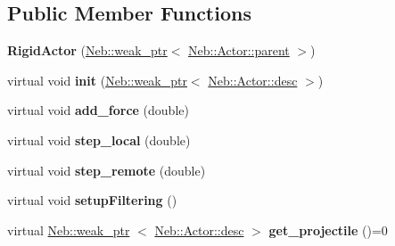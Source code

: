 \subsection*{\-Public \-Member \-Functions}
\begin{DoxyCompactItemize}
\item 
\hypertarget{classNeb_1_1Actor_1_1RigidActor_acdac9f4b947d14a750a9cb77cc612570}{{\bfseries \-Rigid\-Actor} (\hyperlink{classNeb_1_1weak__ptr}{\-Neb\-::weak\-\_\-ptr}$<$ \hyperlink{classNeb_1_1Actor_1_1parent}{\-Neb\-::\-Actor\-::parent} $>$)}\label{classNeb_1_1Actor_1_1RigidActor_acdac9f4b947d14a750a9cb77cc612570}

\item 
\hypertarget{classNeb_1_1Actor_1_1RigidActor_abf7c5bf09cee03a13bb073fa6f7f3317}{virtual void {\bfseries init} (\hyperlink{classNeb_1_1weak__ptr}{\-Neb\-::weak\-\_\-ptr}$<$ \hyperlink{classNeb_1_1Actor_1_1desc}{\-Neb\-::\-Actor\-::desc} $>$)}\label{classNeb_1_1Actor_1_1RigidActor_abf7c5bf09cee03a13bb073fa6f7f3317}

\item 
\hypertarget{classNeb_1_1Actor_1_1RigidActor_a8aa2a620e7a3088219049fa032b35854}{virtual void {\bfseries add\-\_\-force} (double)}\label{classNeb_1_1Actor_1_1RigidActor_a8aa2a620e7a3088219049fa032b35854}

\item 
\hypertarget{classNeb_1_1Actor_1_1RigidActor_a31a3b08505a589ef8e796265725df8d6}{virtual void {\bfseries step\-\_\-local} (double)}\label{classNeb_1_1Actor_1_1RigidActor_a31a3b08505a589ef8e796265725df8d6}

\item 
\hypertarget{classNeb_1_1Actor_1_1RigidActor_a60b4de7ce5d629dbcb79050ef97a42a8}{virtual void {\bfseries step\-\_\-remote} (double)}\label{classNeb_1_1Actor_1_1RigidActor_a60b4de7ce5d629dbcb79050ef97a42a8}

\item 
\hypertarget{classNeb_1_1Actor_1_1RigidActor_aeba39e9899ccf3fd7f03fde94311f849}{virtual void {\bfseries setup\-Filtering} ()}\label{classNeb_1_1Actor_1_1RigidActor_aeba39e9899ccf3fd7f03fde94311f849}

\item 
\hypertarget{classNeb_1_1Actor_1_1RigidActor_a67a6b581d1d92bf55c9bccc4821f30bf}{virtual \hyperlink{classNeb_1_1weak__ptr}{\-Neb\-::weak\-\_\-ptr}\*
$<$ \hyperlink{classNeb_1_1Actor_1_1desc}{\-Neb\-::\-Actor\-::desc} $>$ {\bfseries get\-\_\-projectile} ()=0}\label{classNeb_1_1Actor_1_1RigidActor_a67a6b581d1d92bf55c9bccc4821f30bf}


\end{DoxyCompactItemize}
